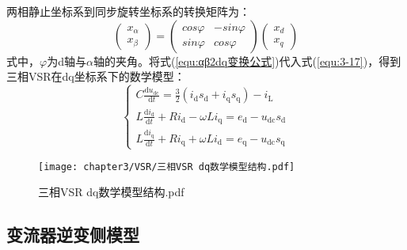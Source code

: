 两相静止坐标系到同步旋转坐标系的转换矩阵为：
\begin{equation}
	\begin{pmatrix}
		x_{\alpha } \\
		x_{\beta }
	\end{pmatrix}=
	\begin{pmatrix}
		cos\varphi & -sin\varphi \\
		sin\varphi & cos\varphi
	\end{pmatrix}
	\begin{pmatrix}
		x_{d } \\
		x_{q}
	\end{pmatrix}
	\label{equ:αβ2dq变换公式}
\end{equation}
式中，$\varphi$为d轴与$\alpha$轴的夹角。将式(\ref{equ:αβ2dq变换公式})代入式(\ref{equ:3-17})，得到
三相VSR在dq坐标系下的数学模型：
\begin{equation}
	\begin{cases}
		C \frac{\mathrm{d} u_{\mathrm{dc}}}{\mathrm{d} t}=\frac{3}{2}\left(i_{\mathrm{d}} s_{\mathrm{d}}+i_{\mathrm{q}} s_{\mathrm{q}}\right)-i_{\mathrm{L}} \\
		L \frac{\mathrm{d} i_{\mathrm{d}}}{\mathrm{d} t}+R i_{\mathrm{d}}-\omega L i_{\mathrm{q}}=e_{\mathrm{d}}-u_{\mathrm{dc}} s_{\mathrm{d}}              \\
		L \frac{\mathrm{d} i_{\mathrm{q}}}{\mathrm{d} t}+R i_{\mathrm{q}}+\omega L i_{\mathrm{d}}=e_{\mathrm{q}}-u_{\mathrm{dc}} s_{\mathrm{q}}
	\end{cases}
	\label{equ:VSR dq数学模型}
\end{equation}

\begin{figure}[!htp]
	\centering
	\texttt{[image: chapter3/VSR/三相VSR dq数学模型结构.pdf]}
	\caption{三相VSR dq数学模型结构.pdf}
	\label{fig:三相VSR dq数学模型结构.pdf}
\end{figure}

\subsection{变流器逆变侧模型}

